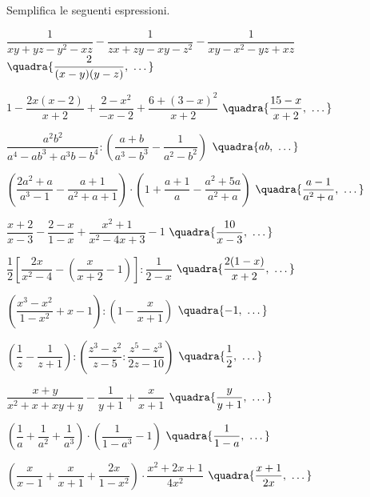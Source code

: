 \begin{esercizio}[\Ast]
\label{ese:19.38}
Semplifica le seguenti espressioni.
\begin{enumeratea}
 \item \(\dfrac{1}{xy+yz-y^{2}-xz}-\dfrac{1}{zx+zy-xy-z^{2}}-
        \dfrac{1}{xy-x^{2}-yz+xz}\)
  \hfill {\footnotesize \(\quadra{\dfrac{2}{(x-y)(y-z)},~\dots}\)}
 \item \(1-\dfrac{2x(x-2)}{x+2}+\dfrac{2-x^{2}}{-x-2}+
        \dfrac{6+(3-x)^{2}}{x+2}\)
  \hfill {\footnotesize \(\quadra{\dfrac{15-x}{x+2},~\dots}\)}
 \item \(\dfrac{a^{2}b^{2}}{a^{4}-ab^{3}+a^{3}b-b^{4}}:
        \left(\dfrac{a+b}{a^{3}-b^{3}}-\dfrac{1}{a^{2}-b^{2}}\right)\)
  \hfill {\footnotesize \(\quadra{ab,~\dots}\)}
 \item \(\left(\dfrac{2a^{2}+a}{a^{3}-1}-\dfrac{a+1}{a^{2}+a+1}\right)\cdot 
        \left(1+\dfrac{a+1}{a}-\dfrac{a^{2}+5a}{a^{2}+a}\right)\)
  \hfill {\footnotesize \(\quadra{\dfrac{a-1}{a^{2}+a},~\dots}\)}
 \item \(\dfrac{x+2}{x-3}-\dfrac{2-x}{1-x}+\dfrac{x^{2}+1}{x^{2}-4x+3}-1\)
  \hfill {\footnotesize \(\quadra{\dfrac{10}{x-3},~\dots}\)}
 \item \(\dfrac{1}{2}\left[\dfrac{2x}{x^{2}-4}-
        \left(\dfrac{x}{x+2}-1\right)\right]:\dfrac{1}{2-x}\)
  \hfill {\footnotesize \(\quadra{\dfrac{2(1-x)}{x+2},~\dots}\)}
 \item \(\left(\dfrac{x^{3}-x^{2}}{1-x^{2}}+x-1\right):
        \left(1-\dfrac{x}{x+1}\right)\)
  \hfill {\footnotesize \(\quadra{-1,~\dots}\)}
 \item \(\left(\dfrac{1}{z}-\dfrac{1}{z+1}\right):
        \left(\dfrac{z^{3}-z^{2}}{z-5}:\dfrac{z^{5}-z^{3}}{2z-10}\right)\)
  \hfill {\footnotesize \(\quadra{\dfrac{1}{2},~\dots}\)}
 \item \(\dfrac{x+y}{x^{2}+x+xy+y}-\dfrac{1}{y+1}+\dfrac{x}{x+1}\)
  \hfill {\footnotesize \(\quadra{\dfrac{y}{y+1},~\dots}\)}
 \item \(\left(\dfrac{1}{a}+\dfrac{1}{a^{2}}+\dfrac{1}{a^{3}}\right)\cdot 
        \left(\dfrac{1}{1-a^{3}}-1\right)\)
  \hfill {\footnotesize \(\quadra{\dfrac{1}{1-a},~\dots}\)}
 \item \(\left(\dfrac{x}{x-1}+\dfrac{x}{x+1}+\dfrac{2x}{1-x^{2}}\right)\cdot 
       {\dfrac{x^{2}+2x+1}{4x^{2}}}\)
  \hfill {\footnotesize \(\quadra{\dfrac{x+1}{2x},~\dots}\)}

\end{enumeratea}
\end{esercizio}
